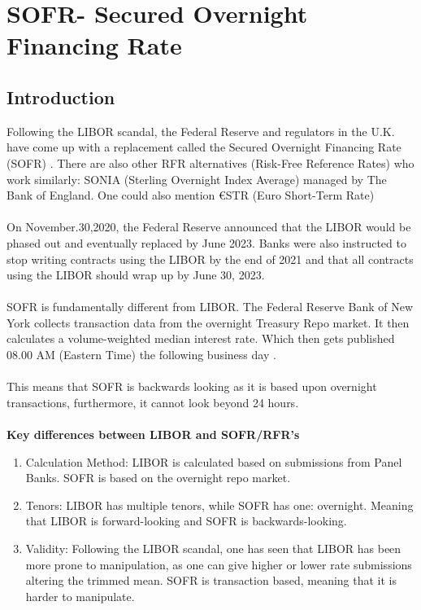 \chapter{SOFR- Secured Overnight Financing Rate}
\label{chp_SOFR}

\section{Introduction}
Following the LIBOR scandal, the Federal Reserve and regulators in the U.K. have come up with a replacement called the Secured Overnight Financing Rate (SOFR) .
There are also other RFR alternatives (Risk-Free Reference Rates)  who work similarly: SONIA (Sterling Overnight Index Average) 
 managed by The Bank of England. One could also mention €STR (Euro Short-Term Rate) 
\cite{CME_SOFR}
\\~\\
On November.30,2020, the Federal Reserve announced that the LIBOR would be phased out and eventually replaced by June 2023. Banks were also instructed to stop writing contracts using the LIBOR by the end of 2021 and that all contracts using the LIBOR should wrap up by June 30, 2023. \cite{hayes_2022}
\\~\\ 
SOFR is fundamentally different from LIBOR. The Federal Reserve Bank of New York collects transaction data from the overnight Treasury Repo market. It then calculates a volume-weighted median interest rate. Which then gets published 08.00 AM (Eastern Time) the following business day \cite{ARRC_SOFR}.
\\~\\ 
This means that SOFR is backwards looking as it is based upon overnight transactions, furthermore, it cannot look beyond 24 hours.  
\\~\\
\textbf{Key differences between LIBOR and SOFR/RFR's}

\begin{enumerate}
    \item Calculation Method: LIBOR is calculated based on submissions from Panel Banks. SOFR is based on the overnight repo market. 
    \item Tenors: LIBOR has multiple tenors, while SOFR has one: overnight. Meaning that LIBOR is forward-looking and SOFR is backwards-looking. 
    \item Validity: Following the LIBOR scandal, one has seen that LIBOR has been more prone to manipulation, as one can give higher or lower rate submissions altering the trimmed mean. SOFR is transaction based, meaning that it is harder to manipulate. 
\end{enumerate}

